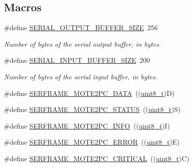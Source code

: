\subsection*{Macros}
\begin{DoxyCompactItemize}
\item 
\#define \hyperlink{group___open_serial_gabfe80eb43785493f268187a201692d8e}{S\+E\+R\+I\+A\+L\+\_\+\+O\+U\+T\+P\+U\+T\+\_\+\+B\+U\+F\+F\+E\+R\+\_\+\+S\+I\+ZE}~256
\begin{DoxyCompactList}\small\item\em Number of bytes of the serial output buffer, in bytes. \end{DoxyCompactList}\item 
\#define \hyperlink{group___open_serial_ga8221a6836587db0f71d30e1da1c1bab3}{S\+E\+R\+I\+A\+L\+\_\+\+I\+N\+P\+U\+T\+\_\+\+B\+U\+F\+F\+E\+R\+\_\+\+S\+I\+ZE}~200
\begin{DoxyCompactList}\small\item\em Number of bytes of the serial input buffer, in bytes. \end{DoxyCompactList}\item 
\#define \hyperlink{group___open_serial_ga05f31978f76635b7d03976fc5efb1c58}{S\+E\+R\+F\+R\+A\+M\+E\+\_\+\+M\+O\+T\+E2\+P\+C\+\_\+\+D\+A\+TA}~((\hyperlink{_p_e___types_8h_aba7bc1797add20fe3efdf37ced1182c5}{uint8\+\_\+t})\textquotesingle{}D\textquotesingle{})
\item 
\#define \hyperlink{group___open_serial_ga4203a6f0869eb08957dc6ff6a6ee2530}{S\+E\+R\+F\+R\+A\+M\+E\+\_\+\+M\+O\+T\+E2\+P\+C\+\_\+\+S\+T\+A\+T\+US}~((\hyperlink{_p_e___types_8h_aba7bc1797add20fe3efdf37ced1182c5}{uint8\+\_\+t})\textquotesingle{}S\textquotesingle{})
\item 
\#define \hyperlink{group___open_serial_gac3d784a689f2ca9645b40d2c960bba2d}{S\+E\+R\+F\+R\+A\+M\+E\+\_\+\+M\+O\+T\+E2\+P\+C\+\_\+\+I\+N\+FO}~((\hyperlink{_p_e___types_8h_aba7bc1797add20fe3efdf37ced1182c5}{uint8\+\_\+t})\textquotesingle{}I\textquotesingle{})
\item 
\#define \hyperlink{group___open_serial_gac4754d961b84d7f03fc34909b9e692ed}{S\+E\+R\+F\+R\+A\+M\+E\+\_\+\+M\+O\+T\+E2\+P\+C\+\_\+\+E\+R\+R\+OR}~((\hyperlink{_p_e___types_8h_aba7bc1797add20fe3efdf37ced1182c5}{uint8\+\_\+t})\textquotesingle{}E\textquotesingle{})
\item 
\#define \hyperlink{group___open_serial_gab3f15a565c3666cc1c8d549eae65fa67}{S\+E\+R\+F\+R\+A\+M\+E\+\_\+\+M\+O\+T\+E2\+P\+C\+\_\+\+C\+R\+I\+T\+I\+C\+AL}~((\hyperlink{_p_e___types_8h_aba7bc1797add20fe3efdf37ced1182c5}{uint8\+\_\+t})\textquotesingle{}C\textquotesingle{})

\end{DoxyCompactItemize}
